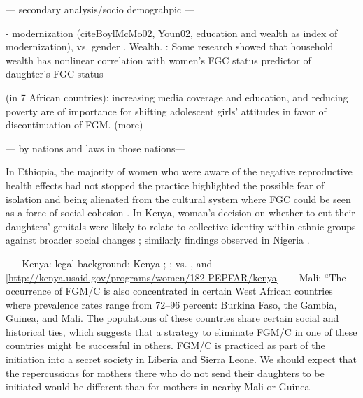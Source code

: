 \documentclass[12pt,]{article}
\begin{document}
— secondary analysis/socio demograhpic —

- modernization (cite{BoylMcMo02, Youn02}, education and wealth as index of modernization), vs. gender \cite{DalaLawo10, Dell04, FrieMahm13, Lewi04, Meye00, Njam04, YirgKass12, Youn02}. 
   Wealth.  \cite{Hayf05}: Some research showed that household wealth has nonlinear correlation with women's FGC status predictor of daughter's FGC status


\cite{DalaKalm18}(in 7 African countries): increasing media coverage and education, and reducing poverty are of importance for shifting adolescent girls' attitudes in favor of discontinuation of FGM.
\cite{Hayf05, PashPonn16} (more)




— by nations and laws in those nations—


In Ethiopia, the majority of women who were aware of the negative reproductive health effects had not stopped the practice highlighted the possible fear of isolation and being alienated from the cultural system where FGC could be seen as a force of social cohesion \cite{YirgKass12}.  In Kenya, woman's decision on whether to cut their daughters' genitals were likely to relate to collective identity within ethnic groups against broader social changes \cite{Achi14, Hayf05}; similarly findings observed in Nigeria \cite{FreyJohn07, KandMwek09}.


---- Kenya: legal background:  Kenya \cite{GKEN01}; \cite{UNIC13}; 
 vs. \cite{Chia14, Hayf05}, and [\url{http://kenya.usaid.gov/programs/women/182 PEPFAR/kenya}]
---- Mali: ``The occurrence of FGM/C is also concentrated in certain West African countries where prevalence rates range from 72–96 percent: Burkina Faso, the Gambia, Guinea, and Mali. The populations of these countries share certain social and historical ties, which suggests that a strategy to eliminate FGM/C in one of these countries might be successful in others. FGM/C is practiced as part of the initiation into a secret society in Liberia and Sierra Leone. We should expect that the repercussions for mothers there who do not send their daughters to be initiated would be different than for mothers in nearby Mali or Guinea \cite{YodaWang13}
\end{document}
